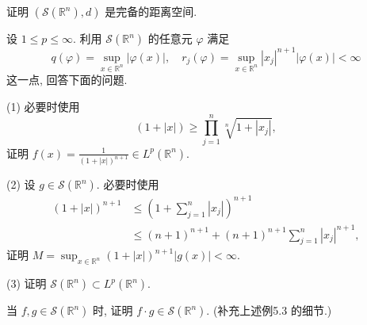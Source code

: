 \begin{exercise}\label{exer:5.2}
证明 $(\mathcal{S}(\mathbb{R}^{n}), d)$ 是完备的距离空间.
\end{exercise}

\begin{exercise}\label{exer:5.3}
设 $1 \leq p \leq \infty$. 利用 $\mathcal{S}(\mathbb{R}^{n})$ 的任意元 $\varphi$ 满足
\[
q(\varphi) = \sup_{x \in \mathbb{R}^{n}}|\varphi(x)|, \quad r_{j}(\varphi) = \sup_{x \in \mathbb{R}^{n}}|x_{j}|^{n+1}|\varphi(x)| < \infty
\]
这一点, 回答下面的问题.

(1) 必要时使用
\[
(1+|x|) \geq \prod_{j=1}^{n}\sqrt[n]{1+|x_{j}|},
\]
证明 $f(x) = \frac{1}{(1+|x|)^{n+1}} \in L^{p}(\mathbb{R}^{n})$.

(2) 设 $g \in \mathcal{S}(\mathbb{R}^{n})$. 必要时使用
\[
\begin{aligned}
(1+|x|)^{n+1} &\leq \left(1+\sum_{j=1}^{n}|x_{j}|\right)^{n+1} \\
&\leq (n+1)^{n+1} + (n+1)^{n+1}\sum_{j=1}^{n}|x_{j}|^{n+1},
\end{aligned}
\]
证明 $M = \sup_{x \in \mathbb{R}^{n}}(1+|x|)^{n+1}|g(x)| < \infty$.

(3) 证明 $\mathcal{S}(\mathbb{R}^{n}) \subset L^{p}(\mathbb{R}^{n})$.
\end{exercise}

\begin{exercise}\label{exer:5.4}
当 $f, g \in \mathcal{S}(\mathbb{R}^{n})$ 时, 证明 $f \cdot g \in \mathcal{S}(\mathbb{R}^{n})$. (补充上述例5.3 的细节.)
\end{exercise}
